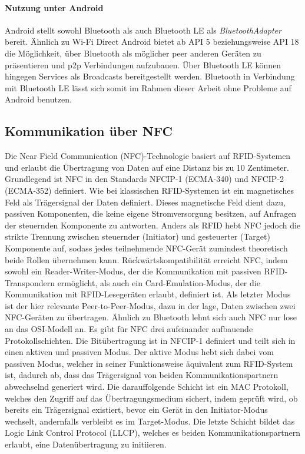         \paragraph{Nutzung unter Android}
        Android stellt sowohl Bluetooth als auch Bluetooth LE als {\it BluetoothAdapter} bereit. Ähnlich zu Wi-Fi Direct  Android bietet ab API 5 beziehungsweise API 18 die Möglichkeit, über Bluetooth als möglicher peer anderen Geräten zu präsentieren und
        p2p Verbindungen aufzubauen. Über Bluetooth LE können hingegen Services als Broadcasts bereitgestellt werden. Bluetooth in Verbindung mit Bluetooth LE lässt sich somit im Rahmen dieser Arbeit ohne Probleme auf Android benutzen.

    \subsection{Kommunikation über NFC}
        Die Near Field Communication (NFC)-Technologie basiert auf RFID-Systemen und erlaubt die Übertragung von Daten auf eine Distanz bis zu 10 Zentimeter.
        Grundlegend ist NFC in den Standards NFCIP-1 (ECMA-340) und NFCIP-2 (ECMA-352) definiert. Wie bei klassischen RFID-Systemen ist ein magnetisches Feld
        als Trägersignal der Daten definiert. Dieses magnetische Feld dient dazu, passiven Komponenten, die keine eigene Stromversorgung besitzen, auf Anfragen
        der steuernden Komponente zu antworten. Anders als RFID hebt NFC jedoch die strikte Trennung zwischen steuernder (Initiator) und gesteuerter (Target) Komponente auf, sodass
        jedes teilnehmende NFC-Gerät zumindest theoretisch beide Rollen übernehmen kann.\cite[S.89]{AI-Langer} Rückwärtskompatibilität erreicht NFC,
        indem sowohl ein Reader-Writer-Modus, der die Kommunikation mit passiven RFID-Transpondern ermöglicht,
        als auch ein Card-Emulation-Modus, der die Kommunikation mit RFID-Lesegeräten erlaubt, definiert ist.\cite[S.99f.]{AI-Langer}
        Als letzter Modus ist der hier relevante Peer-to-Peer-Modus, dazu in der lage, Daten zwischen zwei NFC-Geräten zu übertragen.
        Ähnlich zu Bluetooth lehnt sich auch NFC nur lose an das OSI-Modell an. Es gibt für NFC drei aufeinander aufbauende Protokollschichten.
        Die Bitübertragung ist in NFCIP-1 definiert und teilt sich in einen aktiven und passiven Modus. Der aktive Modus hebt sich dabei vom passiven Modus,
        welcher in seiner Funktionsweise äquivalent zum RFID-System ist, dadurch ab, dass das Trägersignal von beiden Kommunikationspartnern abwechselnd generiert wird.
        Die darauffolgende Schicht ist ein MAC Protokoll, welches den Zugriff auf das \linebreak Übertragungsmedium sichert, indem geprüft wird, ob bereits ein Trägersignal existiert,
        bevor ein Gerät in den Initiator-Modus wechselt, andernfalls verbleibt es im Target-Modus.
        Die letzte Schicht bildet das Logic Link Control Protocol (LLCP), welches es beiden Kommunikationspartnern erlaubt, eine Datenübertragung zu \linebreak initiieren. \cite[S91.f, S.97]{AI-Langer}

